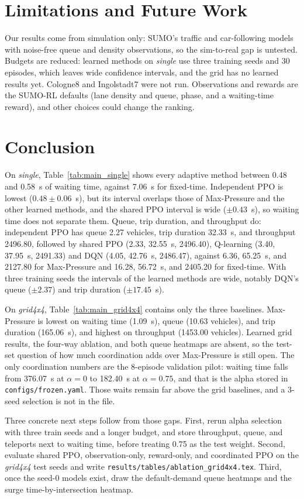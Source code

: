 \documentclass[conference]{IEEEtran}
\begin{document}
\section{Limitations and Future Work}
\label{sec:limitations}
Our results come from simulation only: SUMO's traffic and car-following models with noise-free queue and density observations, so the sim-to-real gap is untested. Budgets are reduced: learned methods on \emph{single} use three training seeds and 30 episodes, which leaves wide confidence intervals, and the grid has no learned results yet. Cologne8 and Ingolstadt7 were not run. Observations and rewards are the SUMO-RL defaults (lane density and queue, phase, and a waiting-time reward), and other choices could change the ranking.

\section{Conclusion}
\label{sec:conclusion}
On \emph{single}, Table~\ref{tab:main_single} shows every adaptive method between 0.48 and 0.58~s of waiting time, against 7.06~s for fixed-time. Independent PPO is lowest ($0.48 \pm 0.06$~s), but its interval overlaps those of Max-Pressure and the other learned methods, and the shared PPO interval is wide ($\pm 0.43$~s), so waiting time does not separate them. Queue, trip duration, and throughput do: independent PPO has queue 2.27 vehicles, trip duration 32.33~s, and throughput 2496.80, followed by shared PPO (2.33, 32.55~s, 2496.40), Q-learning (3.40, 37.95~s, 2491.33) and DQN (4.05, 42.76~s, 2486.47), against 6.36, 65.25~s, and 2127.80 for Max-Pressure and 16.28, 56.72~s, and 2405.20 for fixed-time. With three training seeds the intervals of the learned methods are wide, notably DQN's queue ($\pm 2.37$) and trip duration ($\pm 17.45$~s).

On \emph{grid4x4}, Table~\ref{tab:main_grid4x4} contains only the three baselines. Max-Pressure is lowest on waiting time (1.09~s), queue (10.63 vehicles), and trip duration (165.06~s), and highest on throughput (1453.00 vehicles). Learned grid results, the four-way ablation, and both queue heatmaps are absent, so the test-set question of how much coordination adds over Max-Pressure is still open. The only coordination numbers are the 8-episode validation pilot: waiting time falls from 376.07~s at $\alpha = 0$ to 182.40~s at $\alpha = 0.75$, and that is the alpha stored in \texttt{configs/frozen.yaml}. Those waits remain far above the grid baselines, and a 3-seed selection is not in the file.

Three concrete next steps follow from those gaps. First, rerun alpha selection with three train seeds and a longer budget, and store throughput, queue, and teleports next to waiting time, before treating 0.75 as the test weight. Second, evaluate shared PPO, observation-only, reward-only, and coordinated PPO on the \emph{grid4x4} test seeds and write \texttt{results/tables/ablation\_grid4x4.tex}. Third, once the seed-0 models exist, draw the default-demand queue heatmaps and the surge time-by-intersection heatmap.



\end{document}
